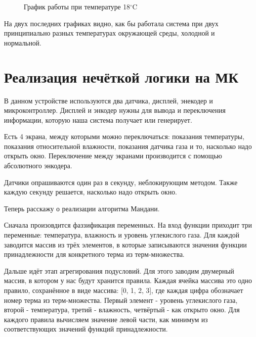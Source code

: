 \documentclass[a4paper]{article}
\begin{document}
\begin{figure}[h]
    \caption{График работы при температуре 18$^{\circ}$C} 
\end{figure}

На двух последних графиках видно, как бы работала система при двух
принципиально разных температурах окружающей среды, холодной и нормальной.

\newpage
\section{Реализация нечёткой логики на МК}
В данном устройстве используются два датчика, дисплей, энекодер и
микроконтроллер. Дисплей и энкодер нужны для вывода и переключения
информации, которую наша система получает или генерирует.

Есть 4 экрана, между которыми можно переключаться: показания температуры,
показания относительной влажности, показания датчика газа и то, насколько
надо открыть окно. Переключение между экранами производится с помощью
абсолютного энкодера.

Датчики опрашиваются один раз в секунду, неблокирующим методом. 
Также каждую секунду решается, насколько надо открыть окно.

Теперь расскажу о реализации алгоритма Мандани.

Сначала произовдится фаззификация переменных. На вход функции приходит
три переменные: температура, влажность и уровень углекислого газа.
Для каждой заводится массив из трёх элементов, в которые записываются
значения функции принадлежности для конкретного терма из терм-множества.

Дальше идёт этап агрегирования подусловий. Для этого заводим 
двумерный массив, в котором у нас будут хранится правила. 
Каждая ячейка массива это одно правило, сохранённое в виде массива: 
[0, 1, 2, 3], где каждая цифра обозначает номер терма из терм-множества.
Первый элемент - уровень углекислого газа, второй - температура,
третий - влажность, четвёртый - как открыто окно.
Для каждого правила вычисляем значение левой части, как минимум из
соответствующих значений функций принадлежности.
\end{document}
